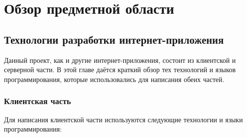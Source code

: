 \chapter{Обзор предметной области}
\section{Технологии разработки интернет-приложе\-ния}
	Данный проект, как и другие интернет-приложения,  состоит из клиентской и серверной части. В этой главе даётся краткий обзор тех технологий и языков программирования, которые использовались для написания обеих частей.
\subsection{Клиентская часть}
	Для написания клиентской части используются следующие технологии и языки программирования:
